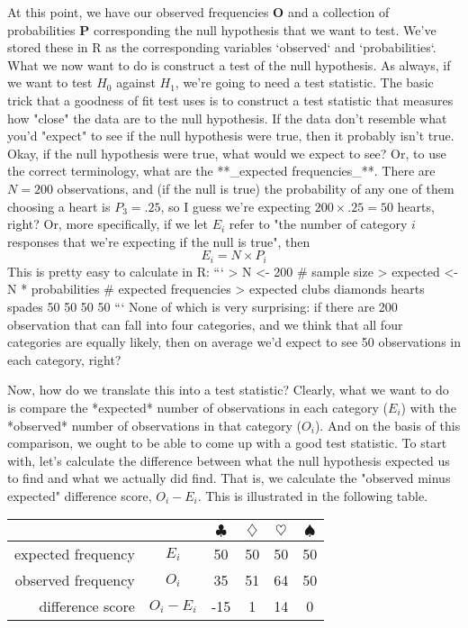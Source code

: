 At this point, we have our observed frequencies $\bm{O}$ and a collection of probabilities $\bm{P}$ corresponding the null hypothesis that we want to test. We've stored these in R as the corresponding variables `observed` and `probabilities`. What we now want to do is construct a test of the null hypothesis. As always, if we want to test $H_0$ against $H_1$, we're going to need a test statistic. The basic trick that a goodness of fit test uses is to construct a test statistic that measures how "close" the data are to the null hypothesis. If the data don't resemble what you'd "expect" to see if the null hypothesis were true, then it probably isn't true. Okay, if the null hypothesis were true, what would we expect to see? Or, to use the correct terminology, what are the **_expected frequencies_**. There are $N=200$ observations, and (if the null is true) the probability of any one of them choosing a heart is $P_3 = .25$, so I guess we're expecting $200 \times .25 = 50$ hearts, right? Or, more specifically, if we let $E_i$ refer  to "the number of category $i$ responses that we're expecting if the null is true", then
$$
E_i = N \times P_i
$$
This is pretty easy to calculate in R:
```
> N <- 200  # sample size
> expected <- N * probabilities # expected frequencies
> expected
   clubs diamonds   hearts   spades 
      50       50       50       50 
```
None of which is very surprising: if there are 200 observation that can fall into four categories, and we think that all four categories are equally likely, then on average we'd expect to see 50 observations in each category, right?

Now, how do we translate this into a test statistic? Clearly, what we want to do is compare the *expected* number of observations in each category ($E_i$) with the *observed* number of observations in that category ($O_i$). And on the basis of this comparison, we ought to be able to come up with a good test statistic. To start with, let's calculate the difference between what the null hypothesis expected us to find and what we actually did find. That is, we calculate the "observed minus expected" difference score, $O_i - E_i$. This is illustrated in the following table. 

\begin{center}
\begin{tabular}{rc|cccc}
& & $\clubsuit$ & $\diamondsuit$ & $\heartsuit$ & $\spadesuit$ \\ \hline 
expected frequency &$E_i$ & 50 & 50 & 50 & 50 \\ 
observed frequency &$O_i$ & 35 & 51 & 64 & 50 \\ 
difference score & $O_i - E_i$ & -15 & 1 & 14 & 0 \\
\end{tabular}
\end{center}


